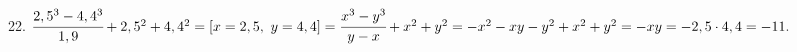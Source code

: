 22. $\cfrac{2,5^3-4,4^3}{1,9}+2,5^2+4,4^2=[x=2,5,\ y=4,4]=\cfrac{x^3-y^3}{y-x}+x^2+y^2=
-x^2-xy-y^2+x^2+y^2=-xy=-2,5\cdot4,4=-11.$\\
